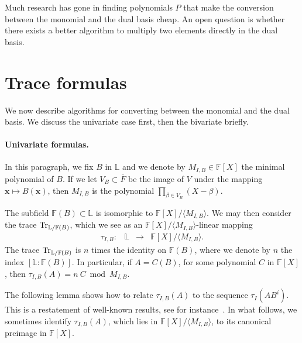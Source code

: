 \documentclass[12pt]{article}
\def\F {\ensuremath{\mathbb{F}}}
\def\L {\ensuremath{\mathbb{L}}}
\def\x {\ensuremath{\mathbf{x}}}
\begin{document}
Much research has gone in finding polynomials $P$ that make the
conversion between the monomial and the dual basis cheap. An open
question is whether there exists a better algorithm to multiply two
elements directly in the dual basis.




\section{Trace formulas} 
\label{sec:trace-formulas}

We now describe algorithms for converting between the monomial and the
dual basis. We discuss the univariate case first, then the bivariate
briefly.


\paragraph{Univariate formulas.} In this paragraph, we fix $B$ in $\L$ and we 
denote by $M_{I,B} \in \F[X]$ the minimal polynomial of $B$. If we let
$V_B \subset \overline{F}$ be the image of $V$ under the mapping $\x \mapsto
B(\x)$, then $M_{I,B}$ is the polynomial $\prod_{\beta \in
  V_B}(X-\beta)$.

The subfield $\F(B) \subset \L$ is isomorphic to $\F[X]/\langle
M_{I,B} \rangle$. We may then consider the trace
${\rm Tr}_{\L/\F(B)}$, which we see as an $\F[X]/\langle
M_{I,B}\rangle$-linear mapping
$$
\begin{array}{cccc}
\tau_{I,B} :& \L& \to& \F[X]/\langle M_{I,B} \rangle.
\end{array}$$
The trace ${\rm Tr}_{\L/\F(B)}$ is $n$ times the identity on $\F(B)$,
where we denote by $n$ the index $[\L:\F(B)]$. In particular, if
$A=C(B)$, for some polynomial $C$ in $\F[X]$, then $\tau_{I,B}(A)=n
\ C \bmod M_{I,B}$.

The following lemma shows how to relate $\tau_{I,B} (A)$ to the
sequence $\tau_I(A B^i)$. This is a restatement of well-known results,
see for instance~\cite{rouiller99}. In what follows, we sometimes
identify $\tau_{I,B}(A)$, which lies in $\F[X]/\langle M_{I,B} \rangle$,
to its canonical preimage in $\F[X]$.
\end{document}
